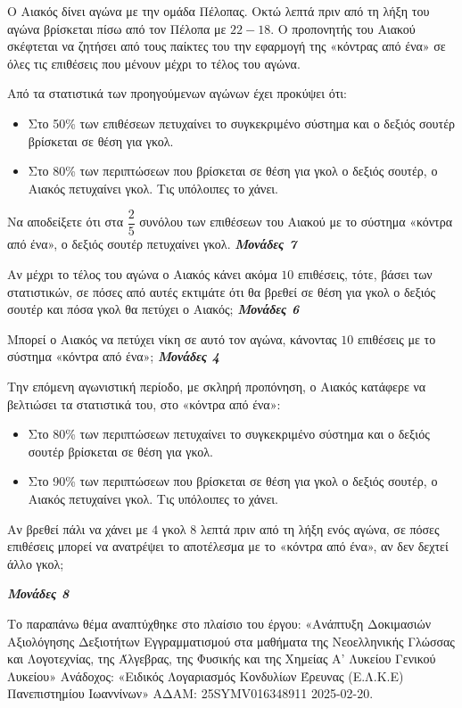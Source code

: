 \documentclass[11pt,a4paper,twoside]{book}
\newcommand{\monades}[1]{
\hspace*{\fill}
\textbf{\textit{\textcolor{maincolor}{Μονάδες #1}}}}
\begin{document}
\begin{alist}
\item Ο Αιακός δίνει αγώνα με την ομάδα Πέλοπας. Οκτώ λεπτά πριν από τη λήξη του αγώνα βρίσκεται πίσω από τον Πέλοπα με $22-18$. Ο προπονητής του Αιακού σκέφτεται να ζητήσει από τους παίκτες του την εφαρμογή της «κόντρας από ένα» σε όλες τις επιθέσεις που μένουν μέχρι το τέλος του αγώνα.

Από τα στατιστικά των προηγούμενων αγώνων έχει προκύψει ότι:

\begin{itemize}
\item
  Στο 50\% των επιθέσεων πετυχαίνει το συγκεκριμένο σύστημα και ο δεξιός σουτέρ βρίσκεται σε θέση για γκολ.
\item
  Στο 80\% των περιπτώσεων που βρίσκεται σε θέση για γκολ ο δεξιός σουτέρ, ο Αιακός πετυχαίνει γκολ. Τις υπόλοιπες το χάνει.
\end{itemize}
\begin{rlist}
\item
  Να αποδείξετε ότι στα $\dfrac{2}{5}$ συνόλου των επιθέσεων του Αιακού με το σύστημα «κόντρα από ένα», ο δεξιός σουτέρ πετυχαίνει γκολ.\monades{7}
\item
  Αν μέχρι το τέλος του αγώνα ο Αιακός κάνει ακόμα $10$ επιθέσεις, τότε, βάσει των στατιστικών, σε πόσες από αυτές εκτιμάτε ότι θα βρεθεί σε θέση για γκολ ο δεξιός σουτέρ και πόσα γκολ θα πετύχει ο Αιακός;\monades{6}
\item
  Μπορεί ο Αιακός να πετύχει νίκη σε αυτό τον αγώνα, κάνοντας $10$ επιθέσεις με το σύστημα «κόντρα από ένα»;\monades{4}
\end{rlist}
\item Την επόμενη αγωνιστική περίοδο, με σκληρή προπόνηση, ο Αιακός κατάφερε να βελτιώσει τα στατιστικά του, στο «κόντρα από ένα»:
\begin{itemize}
\item
  Στο 80\% των περιπτώσεων πετυχαίνει το συγκεκριμένο σύστημα και ο δεξιός σουτέρ βρίσκεται σε θέση για γκολ.
\item
  Στο 90\% των περιπτώσεων που βρίσκεται σε θέση για γκολ ο δεξιός σουτέρ, ο Αιακός πετυχαίνει γκολ. Τις υπόλοιπες το χάνει.
\end{itemize}

Αν βρεθεί πάλι να χάνει με $4$ γκολ $8$ λεπτά πριν από τη λήξη ενός αγώνα, σε πόσες επιθέσεις μπορεί να ανατρέψει το αποτέλεσμα με το «κόντρα από ένα», αν δεν δεχτεί άλλο γκολ;
\monades{8}

{\footnotesize Το παραπάνω θέμα αναπτύχθηκε στο πλαίσιο του έργου: «Ανάπτυξη Δοκιμασιών Αξιολόγησης Δεξιοτήτων Εγγραμματισμού στα μαθήματα της Νεοελληνικής Γλώσσας και Λογοτεχνίας, της Άλγεβρας, της Φυσικής και της Χημείας Α' Λυκείου Γενικού Λυκείου» Ανάδοχος: «Ειδικός Λογαριασμός Κονδυλίων Έρευνας (Ε.Λ.Κ.Ε) Πανεπιστημίου Ιωαννίνων» ΑΔΑΜ: 25SYMV016348911 2025-02-20.}
\end{alist}
\end{document}
